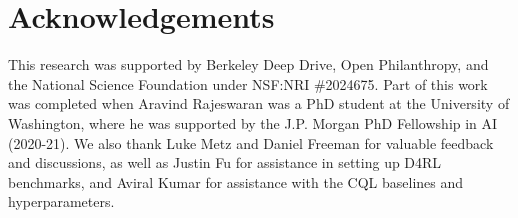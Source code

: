 
\section*{Acknowledgements}

This research was supported by Berkeley Deep Drive, Open Philanthropy, and the National Science Foundation under NSF:NRI \#2024675. Part of this work was completed when Aravind Rajeswaran was a PhD student at the University of Washington, where he was supported by the J.P. Morgan PhD Fellowship in AI (2020-21). We also thank Luke Metz and Daniel Freeman for valuable feedback and discussions, as well as Justin Fu for assistance in setting up D4RL benchmarks, and Aviral Kumar for assistance with the CQL baselines and hyperparameters.
